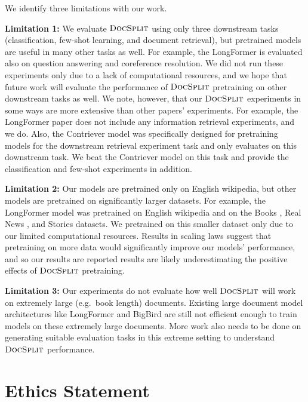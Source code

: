 \documentclass[11pt]{article}
\newcommand{\our}{\mbox{\textsc{DocSplit}}}
\begin{document}
We identify three limitations with our work.

\textbf{Limitation 1:}
We evaluate $\our$ using only three downstream tasks (classification, few-shot learning, and document retrieval),
but pretrained models are useful in many other tasks as well.
For example, the LongFormer \cite{Beltagy2020LongformerTL} is evaluated also on question answering and coreference resolution.
We did not run these experiments only due to a lack of computational resources,
and we hope that future work will evaluate the performance of $\our$ pretraining on other downstream tasks as well.
We note, however, that our $\our$ experiments in some ways are more extensive than other papers' experiments.
For example, the LongFormer paper does not include any information retrieval experiments, and we do.
Also, the Contriever model \citep{Izacard2021UnsupervisedDI} was specifically designed for pretraining models for the downstream retrieval experiment task and only evaluates on this downstream task.
We beat the Contriever model on this task and provide the classification and few-shot experiments in addition.

\textbf{Limitation 2:}
Our models are pretrained only on English wikipedia,
but other models are pretrained on significantly larger datasets.
For example, the LongFormer model was pretrained on English wikipedia and on the Books \citep{zhu2015aligning}, Real News \citep{zellers2019defending}, and Stories \citep{zellers2019defending} datasets.
We pretrained on this smaller dataset only due to our limited computational resources.
Results in scaling laws \citep{kaplan2020scaling} suggest that pretraining on more data would significantly improve our models' performance,
and so our results are reported results are likely underestimating the positive effects of $\our$ pretraining.

\textbf{Limitation 3:}
Our experiments do not evaluate how well $\our$ will work on extremely large (e.g.\ book length) documents.
Existing large document model architectures like LongFormer \cite{Beltagy2020LongformerTL} and BigBird \cite{Zaheer2020BigBT} are still not efficient enough to train models on these extremely large documents.
More work also needs to be done on generating suitable evaluation tasks in this extreme setting to understand $\our$ performance.

\section*{Ethics Statement}
\end{document}
